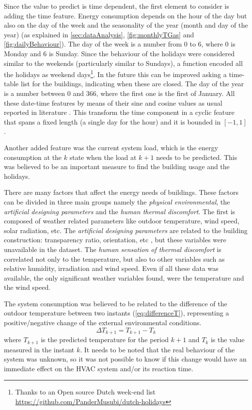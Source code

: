 \documentclass{sig-alternate-sigmod07}
\begin{document}
Since the value to predict is time dependent, the first element to consider is adding the time feature. Energy consumption depends on the hour of the day but also on the day of the week and the seasonality of the year (month and day of the year) (as explained in \cref{sec:dataAnalysis}, \cref{fig:monthlyTGas} and \cref{fig:dailyBehaviour}). The day of the week is a number from $0$ to $6$, where $0$ is Monday and 6 is Sunday. Since the behaviour of the holidays were considered similar to the weekends (particularly similar to Sundays), a function encoded all the holidays as weekend days\footnote{Thanks to an Open source Dutch week-end list \url{https://github.com/PanderMusubi/dutch-holidays}}. In the future this can be improved asking a time-table list for the buildings, indicating when these are closed. The day of the year is a number between $0$ and $366$, where the first one is the first of January. All these date-time features by means of their sine and cosine values as usual reported in literature \cite{ohlsson1994predicting, dodier2004statistical, gonzalez2005prediction}. This transform the time component in a cyclic feature that spans a fixed length (a single day for the hour) and it is bounded in $[-1,1]$.

Another added feature was the current system load, which is the energy consumption at the $k$ state when the load at $k+1$ needs to be predicted. This was believed to be an important measure to find the building usage and the holidays.

There are many factors that affect the energy needs of buildings. These factors can be divided in three main groups namely the \emph{physical environmental}, the \emph{artificial designing parameters} and the \emph{human thermal discomfort}. The first is composed of weather related parameters like outdoor temperature, wind speed, solar radiation, etc. The \emph{artificial designing parameters} are related to the building construction: transparency ratio, orientation, etc \cite{ekici2009prediction}, but these variables were unavailable in the dataset. The \emph{human sensation of thermal discomfort} is correlated not only to the temperature, but also to other variables such as relative humidity, irradiation and wind speed. Even if all these data was available, the only significant weather variables found, were the temperature and the wind speed.

The system consumption was believed to be related to the difference of the outdoor temperature between two instants (\cref{eq:differenceT}), representing a positive/negative change of the external environmental conditions.
\begin{equation}\Delta T_{k+1}=T_{k+1} - T_{k}\label{eq:differenceT}\end{equation} where $T_{k+1}$ is the predicted temperature for the period $k+1$ and $T_k$ is the value measured in the instant $k$. It needs to be noted that the real behaviour of the system was unknown, so it was not possible to know if this change would have an immediate effect on the HVAC system and/or its reaction time.
\end{document}

